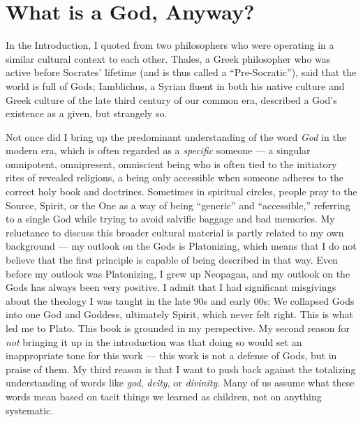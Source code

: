 \documentclass[
]{book}
\begin{document}
\hypertarget{what-is-a-god-anyway}{%
\section{What is a God, Anyway?}\label{what-is-a-god-anyway}}

In the Introduction, I quoted from two philosophers who were operating in a similar cultural context to each other. Thales, a Greek philosopher who was active before Socrates' lifetime (and is thus called a ``Pre-Socratic''), said that the world is full of Gods; Iamblichus, a Syrian fluent in both his native culture and Greek culture of the late third century of our common era, described a God's existence as a given, but strangely so.

Not once did I bring up the predominant understanding of the word \emph{God} in the modern era, which is often regarded as a \emph{specific} someone --- a singular omnipotent, omnipresent, omniscient being who is often tied to the initiatory rites of revealed religions, a being only accessible when someone adheres to the correct holy book and doctrines. Sometimes in spiritual circles, people pray to the Source, Spirit, or the One as a way of being ``generic'' and ``accessible,'' referring to a single God while trying to avoid salvific baggage and bad memories. My reluctance to discuss this broader cultural material is partly related to my own background --- my outlook on the Gods is Platonizing, which means that I do not believe that the first principle is capable of being described in that way. Even before my outlook was Platonizing, I grew up Neopagan, and my outlook on the Gods has always been very positive. I admit that I had significant misgivings about the theology I was taught in the late 90s and early 00s: We collapsed Gods into one God and Goddess, ultimately Spirit, which never felt right. This is what led me to Plato. This book is grounded in my perspective. My second reason for \emph{not} bringing it up in the introduction was that doing so would set an inappropriate tone for this work --- this work is not a defense of Gods, but in praise of them. My third reason is that I want to push back against the totalizing understanding of words like \emph{god}, \emph{deity}, or \emph{divinity}. Many of us assume what these words mean based on tacit things we learned as children, not on anything systematic.
\end{document}
